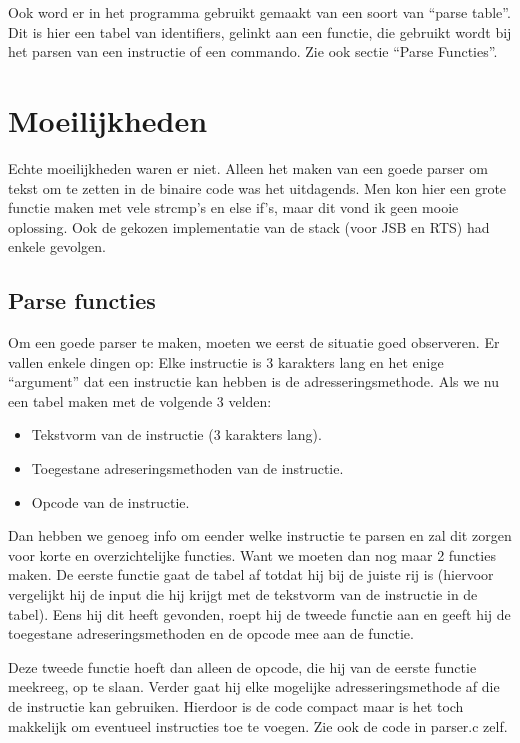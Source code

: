 \documentclass[a4paper,11pt]{article}
\begin{document}
Ook word er in het programma gebruikt gemaakt van een soort van ``parse table''. Dit is hier een tabel van identifiers, gelinkt aan een functie, die gebruikt wordt bij het parsen van een instructie of een commando. Zie ook sectie ``Parse Functies''.

\section{Moeilijkheden}

Echte moeilijkheden waren er niet. Alleen het maken van een goede parser om tekst om te zetten in de binaire code was het uitdagends. Men kon hier een grote functie maken met vele strcmp's en else if's, maar dit vond ik geen mooie oplossing. Ook de gekozen implementatie van de stack (voor JSB en RTS) had enkele gevolgen.

\subsection{Parse functies}

Om een goede parser te maken, moeten we eerst de situatie goed observeren. Er vallen enkele dingen op: Elke instructie is 3 karakters lang en het enige ``argument'' dat een instructie kan hebben is de adresseringsmethode. Als we nu een tabel maken met de volgende 3 velden:

\begin{itemize}
\item Tekstvorm van de instructie (3 karakters lang).
\item Toegestane adreseringsmethoden van de instructie.
\item Opcode van de instructie.
\end{itemize}

Dan hebben we genoeg info om eender welke instructie te parsen en zal dit zorgen voor korte en overzichtelijke functies. Want we moeten dan nog maar 2 functies maken. De eerste functie gaat de tabel af totdat hij bij de juiste rij is (hiervoor vergelijkt hij de input die hij krijgt met de tekstvorm van de instructie in de tabel). Eens hij dit heeft gevonden, roept hij de tweede functie aan en geeft hij de toegestane adreseringsmethoden en de opcode mee aan de functie.

Deze tweede functie hoeft dan alleen de opcode, die hij van de eerste functie meekreeg, op te slaan. Verder gaat hij elke mogelijke adresseringsmethode af die de instructie kan gebruiken. Hierdoor is de code compact maar is het toch makkelijk om eventueel instructies toe te voegen. Zie ook de code in parser.c zelf.
\end{document}
